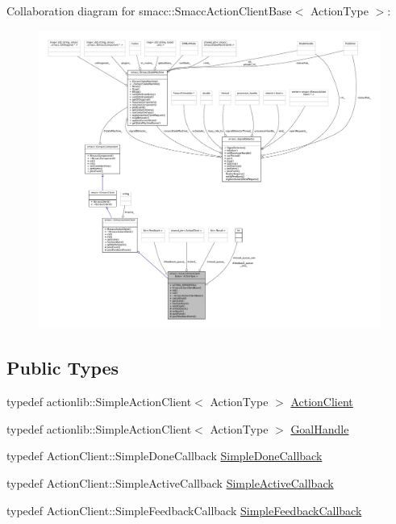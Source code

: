 Collaboration diagram for smacc\+:\+:Smacc\+Action\+Client\+Base$<$ Action\+Type $>$\+:
\nopagebreak
\begin{figure}[H]
\begin{center}
\leavevmode
\includegraphics[width=350pt]{classsmacc_1_1SmaccActionClientBase__coll__graph}
\end{center}
\end{figure}
\subsection*{Public Types}
\begin{DoxyCompactItemize}
\item 
typedef actionlib\+::\+Simple\+Action\+Client$<$ Action\+Type $>$ \hyperlink{classsmacc_1_1SmaccActionClientBase_aea1392d9e41f48bda1de8acaec1c3233}{Action\+Client}
\item 
typedef actionlib\+::\+Simple\+Action\+Client$<$ Action\+Type $>$ \hyperlink{classsmacc_1_1SmaccActionClientBase_a70384df77a0bbf416475e730960a77cf}{Goal\+Handle}
\item 
typedef Action\+Client\+::\+Simple\+Done\+Callback \hyperlink{classsmacc_1_1SmaccActionClientBase_a185a419026fcdbec9ddf4703a1505524}{Simple\+Done\+Callback}
\item 
typedef Action\+Client\+::\+Simple\+Active\+Callback \hyperlink{classsmacc_1_1SmaccActionClientBase_ab99def4cdf0522abaf5a3bf7a444cfcb}{Simple\+Active\+Callback}
\item 
typedef Action\+Client\+::\+Simple\+Feedback\+Callback \hyperlink{classsmacc_1_1SmaccActionClientBase_ad8a68f659fb23e082e75d220515c76f3}{Simple\+Feedback\+Callback}
\end{DoxyCompactItemize}
